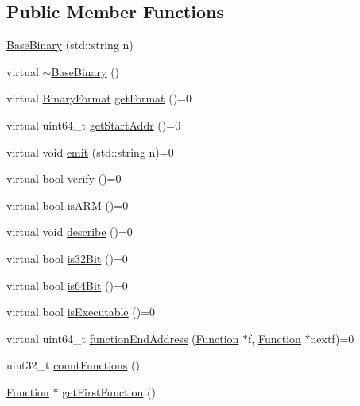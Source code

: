 \subsection*{\-Public \-Member \-Functions}
\begin{DoxyCompactItemize}
\item 
\hyperlink{class_e_p_a_x_1_1_base_binary_ac58ab3c2bd58ffc732e5fa1a2b46e353}{\-Base\-Binary} (std\-::string n)
\item 
virtual \hyperlink{class_e_p_a_x_1_1_base_binary_a5d7991e869ded6715c7ddb68d5ce714b}{$\sim$\-Base\-Binary} ()
\item 
virtual \hyperlink{namespace_e_p_a_x_a4be639c006ef14def4708b37ee6dd67d}{\-Binary\-Format} \hyperlink{class_e_p_a_x_1_1_base_binary_a456741cd16605e5035ab89ab813f4373}{get\-Format} ()=0
\item 
virtual uint64\-\_\-t \hyperlink{class_e_p_a_x_1_1_base_binary_ad23fe3f3a6f5b387df2f4eb7e4a4f23d}{get\-Start\-Addr} ()=0
\item 
virtual void \hyperlink{class_e_p_a_x_1_1_base_binary_a8883d3b0580cae0f5a1960c6fbfd6a1f}{emit} (std\-::string n)=0
\item 
virtual bool \hyperlink{class_e_p_a_x_1_1_base_binary_a3e00d0fecc2defaab16a3ee4b72a32ca}{verify} ()=0
\item 
virtual bool \hyperlink{class_e_p_a_x_1_1_base_binary_ac544fc0d096ca8a555b30fe7126ae846}{is\-A\-R\-M} ()=0
\item 
virtual void \hyperlink{class_e_p_a_x_1_1_base_binary_a501175cac7fb1650bf378d6b4729c1ec}{describe} ()=0
\item 
virtual bool \hyperlink{class_e_p_a_x_1_1_base_binary_ac71bc6c28fe40456ddf626a8bbca257f}{is32\-Bit} ()=0
\item 
virtual bool \hyperlink{class_e_p_a_x_1_1_base_binary_a303cdafe0782ed63d8115bc225f169ee}{is64\-Bit} ()=0
\item 
virtual bool \hyperlink{class_e_p_a_x_1_1_base_binary_aeeb90ae234b0f661ef387ee31d3c4762}{is\-Executable} ()=0
\item 
virtual uint64\-\_\-t \hyperlink{class_e_p_a_x_1_1_base_binary_a3ebaa616622aaca98685ece5d59c05d8}{function\-End\-Address} (\hyperlink{class_e_p_a_x_1_1_function}{\-Function} $\ast$f, \hyperlink{class_e_p_a_x_1_1_function}{\-Function} $\ast$nextf)=0
\item 
uint32\-\_\-t \hyperlink{class_e_p_a_x_1_1_base_binary_ad13288de154013c2746bb08e3eedc935}{count\-Functions} ()
\item 
\hyperlink{class_e_p_a_x_1_1_function}{\-Function} $\ast$ \hyperlink{class_e_p_a_x_1_1_base_binary_a3c55ae83f63c176d8eddb3abb230e45a}{get\-First\-Function} ()

\end{DoxyCompactItemize}
